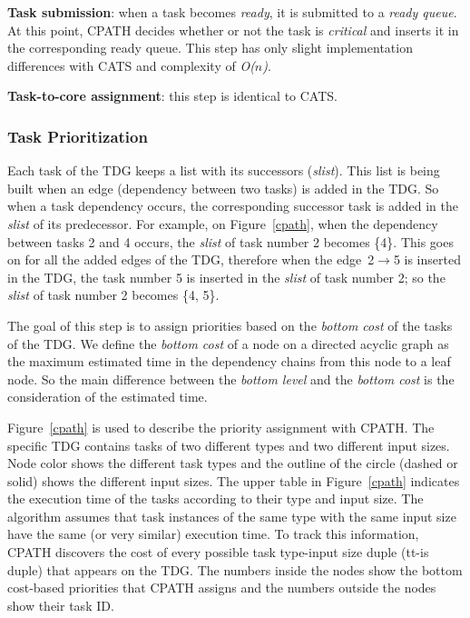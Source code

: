 \textbf{Task submission}: when a task becomes \textit{ready}, it is submitted to a \textit{ready queue}. At this point, CPATH decides whether or not the task is \textit{critical} and inserts it in the corresponding ready queue. This step has only slight implementation differences with CATS and complexity of \textit{O($n$)}.

\textbf{Task-to-core assignment}: this step is identical to CATS.


\subsubsection{Task Prioritization}

Each task of the TDG keeps a list with its successors (\textit{slist}).
This list is being built when an edge (dependency between two tasks) is added in the TDG.
So when a task dependency occurs, the corresponding successor task is added in the \textit{slist} of its predecessor.
For example, on Figure~\ref{cpath}, when the dependency between tasks 2 and 4 occurs, the \textit{slist} of task number 2 becomes \{4\}. 
This goes on for all the added edges of the TDG, therefore when the edge~2$\rightarrow$5 is inserted in the TDG, the task number 5 is inserted in the \textit{slist} of task number 2; so the \textit{slist} of task number 2 becomes \{4, 5\}.

The goal of this step is to assign priorities based on the \textit{bottom cost} of the tasks of the TDG.
We define the \textit{bottom cost} of a node on a directed acyclic graph as the maximum estimated time in the dependency chains from this node to a leaf node.
So the main difference between the \textit{bottom level} and the \textit{bottom cost} is the consideration of the estimated time.

Figure~\ref{cpath} is used to describe the priority assignment with CPATH.
The specific TDG contains tasks of two different types and two different input sizes.
Node color shows the different task types and the outline of the circle (dashed or solid) shows the different input sizes.
The upper table in Figure~\ref{cpath} indicates the execution time of the tasks according to their type and input size.
The algorithm assumes that task instances of the same type with the same input size have the same (or very similar) execution time.
To track this information, CPATH discovers the cost of every possible task type-input size duple (tt-is duple) that appears on the TDG.
The numbers inside the nodes show the bottom cost-based priorities that CPATH assigns and the numbers outside the nodes show their task ID.


